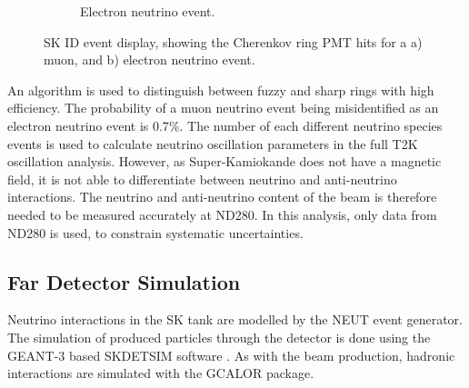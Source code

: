 \begin{figure}
\begin{subfigure}{.5\textwidth}
  \caption{Electron neutrino event.}
  \label{fig:skeventdisplaymuon}
\end{subfigure}
\caption{SK ID event display, showing the Cherenkov ring PMT hits for a a) muon, and b) electron neutrino event.}
\label{fig:skeventdisplay}
\end{figure}

An algorithm\cite{skrecoalg} is used to distinguish between fuzzy and sharp rings with high efficiency. The probability of a muon neutrino event being misidentified as an electron neutrino event is 0.7$\%$. The number of each different neutrino species events is used to calculate neutrino oscillation parameters in the full T2K oscillation analysis. However, as Super-Kamiokande does not have a magnetic field, it is not able to differentiate between neutrino and anti-neutrino interactions. The neutrino and anti-neutrino content of the beam is therefore needed to be measured accurately at ND280. In this analysis, only data from ND280 is used, to constrain systematic uncertainties.

\subsection{Far Detector Simulation}

Neutrino interactions in the SK tank are modelled by the NEUT event generator. The simulation of produced particles through the detector is done using the GEANT-3\cite{geant3} based SKDETSIM software \cite{skdetsim}. As with the beam production, hadronic interactions are simulated with the GCALOR package.

\newpage